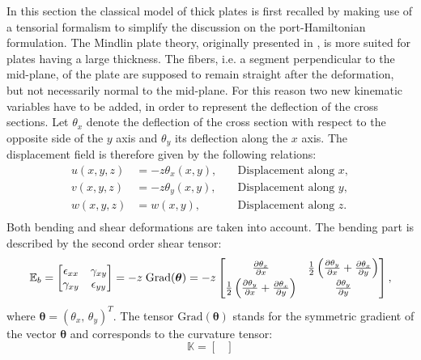 \documentclass[preprint,12pt]{elsarticle}
\newcommand{\secondReviewer}[1]{\textcolor{blue!80!black}{#1}}
\begin{document}
\secondReviewer{In this section the classical model of thick plates is first recalled by making use of a tensorial formalism to simplify the discussion on the port-Hamiltonian formulation.} The Mindlin plate theory, originally presented in \cite{mindlin}, is more suited for plates having a large thickness. The fibers, i.e. a segment perpendicular to the mid-plane, of the plate are supposed to remain straight after the deformation, but not necessarily normal to the mid-plane. For this reason two new kinematic variables have to be added, in order to represent the deflection of the cross sections. \secondReviewer{ Let $\theta_x$ denote the deflection of the cross section with respect to the opposite side of the $y$ axis and  $\theta_y$ its deflection along the $x$ axis. The displacement field is therefore given by the following relations:
\begin{equation}
\begin{aligned}
u(x,y,z) &= -z \theta_x(x,y), \quad &\text{Displacement along $x$}, \\
v(x,y,z) &= -z \theta_y(x,y), \quad &\text{Displacement along $y$}, \\
w(x,y,z) &= w(x,y),  \quad &\text{Displacement along $z$}. \\
\end{aligned}
\end{equation}
Both bending and shear deformations are taken into account. The bending part is described by the second order shear tensor:
\begin{equation}
\mathbb{E}_b = 
\begin{bmatrix}
\epsilon_{xx} & \gamma_{xy} \\
\gamma_{xy} & \epsilon_{yy} \\
\end{bmatrix} = -z \; \mathrm{Grad}(\bm\theta) = -z
\begin{bmatrix}
\diffp{\theta_x}{x} & \frac{1}{2} \left( \diffp{\theta_y}{x} + \diffp{\theta_x}{y} \right)\\
\frac{1}{2} \left( \diffp{\theta_y}{x} + \diffp{\theta_x}{y} \right) & \diffp{\theta_y}{y} \\
\end{bmatrix},
\end{equation}
where $\bm{\theta} = (\theta_x, \, \theta_y)^T$. The tensor $\mathrm{Grad}(\bm{\theta})$ stands for the symmetric gradient of the vector $\bm{\theta}$ and corresponds to the curvature tensor:
\begin{equation}
\mathbb{K} = \begin{bmatrix}

\end{bmatrix}
\end{equation}}
\end{document}
